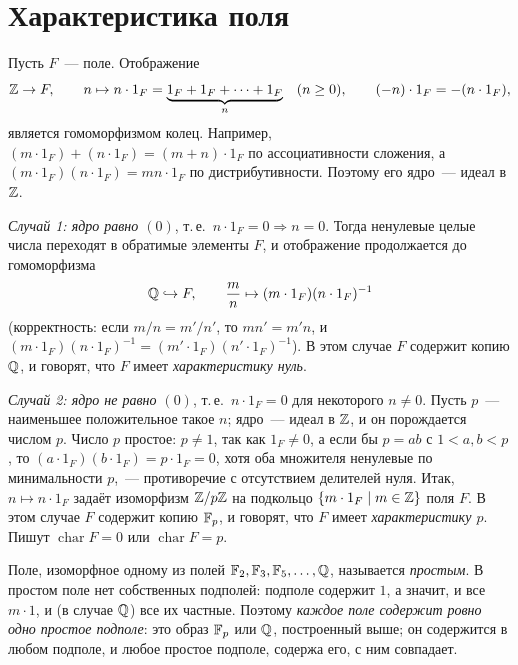 \section{Характеристика поля}

Пусть $F$~--- поле. Отображение
\[
\mathbb Z\to F,\qquad n\mapsto n\cdot1_F=\underbrace{1_F+1_F+\dots+1_F}_{n}\quad(n\ge0),\qquad (-n)\cdot1_F=-(n\cdot1_F),
\]
является гомоморфизмом колец. Например, $(m\cdot1_F)+(n\cdot1_F)=(m+n)\cdot1_F$ по ассоциативности сложения, а
$(m\cdot1_F)(n\cdot1_F)=mn\cdot1_F$ по дистрибутивности. Поэтому его ядро~--- идеал в $\mathbb Z$.

\emph{Случай 1: ядро равно $(0)$}, т.\,е.\ $n\cdot1_F=0\Rightarrow n=0$. Тогда ненулевые целые числа переходят в
обратимые элементы $F$, и отображение продолжается до гомоморфизма
\[
\mathbb Q\hookrightarrow F,\qquad \frac mn\mapsto(m\cdot1_F)(n\cdot1_F)^{-1}
\]
(корректность: если $m/n=m'/n'$, то $mn'=m'n$, и $(m\cdot1_F)(n\cdot1_F)^{-1}=(m'\cdot1_F)(n'\cdot1_F)^{-1}$). В этом случае
$F$ содержит копию $\mathbb Q$, и говорят, что $F$ имеет \emph{характеристику нуль}.

\emph{Случай 2: ядро не равно $(0)$}, т.\,е.\ $n\cdot1_F=0$ для некоторого $n\ne0$. Пусть $p$~--- наименьшее положительное
такое $n$; ядро~--- идеал в $\mathbb Z$, и он порождается числом $p$. Число $p$ простое: $p\ne1$, так как $1_F\ne0$, а если бы
$p=ab$ с $1<a,b<p$, то $(a\cdot1_F)(b\cdot1_F)=p\cdot1_F=0$, хотя оба множителя ненулевые по минимальности $p$,~---
противоречие с отсутствием делителей нуля. Итак, $n\mapsto n\cdot1_F$ задаёт изоморфизм $\mathbb Z/p\mathbb Z$ на подкольцо
$\{m\cdot1_F\mid m\in\mathbb Z\}$ поля $F$. В этом случае $F$ содержит копию $\mathbb F_p$, и говорят, что $F$ имеет
\emph{характеристику $p$}. Пишут $\operatorname{char}F=0$ или $\operatorname{char}F=p$.

Поле, изоморфное одному из полей $\mathbb F_2,\mathbb F_3,\mathbb F_5,\dots,\mathbb Q$, называется \emph{простым}. В простом поле нет собственных
подполей: подполе содержит $1$, а значит, и все $m\cdot1$, и (в случае $\mathbb Q$) все их частные. Поэтому \emph{каждое поле
содержит ровно одно простое подполе}: это образ $\mathbb F_p$ или $\mathbb Q$, построенный выше; он содержится в любом подполе, и
любое простое подполе, содержа его, с ним совпадает.

